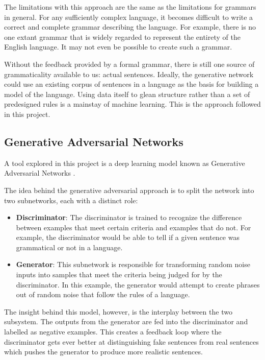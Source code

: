 \documentclass[12pt]{article}
\begin{document}
The limitations with this approach are the same as the limitations for grammars in general. For any sufficiently complex language, it becomes difficult to write a correct and complete grammar describing the language. For example, there is no one extant grammar that is widely regarded to represent the entirety of the English language. It may not even be possible to create such a grammar.

Without the feedback provided by a formal grammar, there is still one source of grammaticality available to us: actual sentences. Ideally, the generative network could use an existing corpus of sentences in a language as the basis for building a model of the language. Using data itself to glean structure rather than a set of predesigned rules is a mainstay of machine learning. This is the approach followed in this project.

\subsection{Generative Adversarial Networks}

A tool explored in this project is a deep learning model known as Generative Adversarial Networks \cite{gen_adv_model}.

The idea behind the generative adversarial approach is to split the network into two subnetworks, each with a distinct role:

\begin{itemize}
    \item \textbf{Discriminator}: The discriminator is trained to recognize the difference between examples that meet certain criteria and examples that do not. For example, the discriminator would be able to tell if a given sentence was grammatical or not in a language.
    \item \textbf{Generator}: This subnetwork is responsible for transforming random noise inputs into samples that meet the criteria being judged for by the discriminator. In this example, the generator would attempt to create phrases out of random noise that follow the rules of a language.
\end{itemize}

The insight behind this model, however, is the interplay between the two subsystem. The outputs from the generator are fed into the discriminator and labelled as negative examples. This creates a feedback loop where the discriminator gets ever better at distinguishing fake sentences from real sentences which pushes the generator to produce more realistic sentences.
\end{document}
